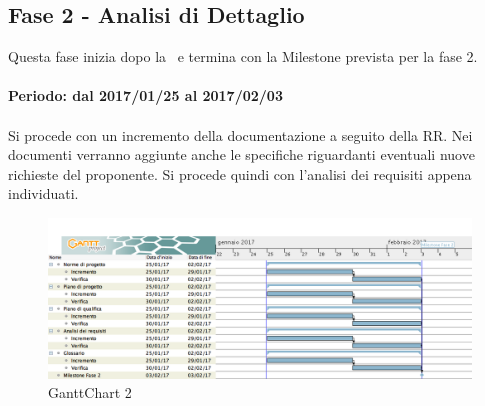 \documentclass[../PianoDiProgetto.tex]{subfiles}
\begin{document}
	\subsection{Fase 2 - Analisi di Dettaglio}
	Questa fase inizia dopo la \revisionedeirequisiti\ e termina con la Milestone prevista per la fase 2.
	\\
	\\
	\textbf{Periodo: dal 2017/01/25 al 2017/02/03}
	\\
	\\
	Si procede con un incremento della documentazione a seguito della RR. Nei documenti verranno aggiunte anche le specifiche riguardanti eventuali nuove richieste del proponente. Si procede quindi con l'analisi dei requisiti appena individuati.
	
	\begin{figure}[!h]
		\centering
		\includegraphics[width=\textwidth]{Pianificazione/Immagini/GanttChart02.png}
		\caption{GanttChart 2}
	\end{figure}	
		
\end{document}
